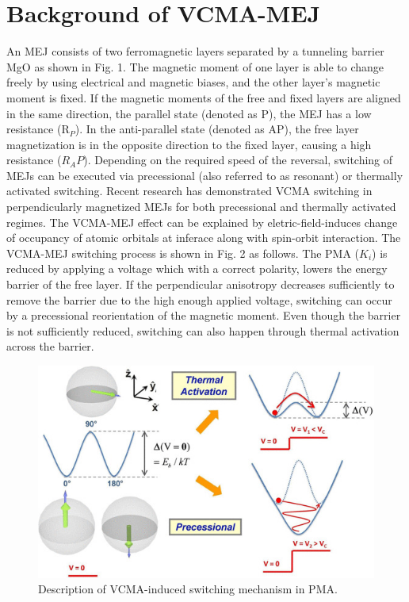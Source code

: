 \documentclass[a4paper, 12pt]{article}
\begin{document}
\section{Background of VCMA-MEJ}
An MEJ consists of two ferromagnetic layers separated by a tunneling barrier MgO as shown in Fig. 1. The magnetic moment of one layer is able to change freely by using electrical and magnetic biases, and the other layer's magnetic moment is fixed. If the magnetic moments of the free and fixed layers are aligned in the same direction, the parallel state (denoted as P), the MEJ has a low resistance (R$_P$). In the anti-parallel state (denoted as AP), the free layer magnetization is in the opposite direction to the fixed layer, causing a high resistance ($R_AP$). Depending on the required speed of the reversal, switching of MEJs can be executed via precessional (also referred to as resonant) or thermally activated switching. Recent research has demonstrated VCMA switching in perpendicularly magnetized MEJs for both precessional and thermally activated regimes. The VCMA-MEJ effect can be explained by eletric-field-induces change of occupancy of atomic orbitals at inferace along with spin-orbit interaction. The VCMA-MEJ switching process is shown in Fig. 2 as follows. The PMA ($K_i$) is reduced by applying a voltage which with a correct polarity, lowers the energy barrier of the free layer. If the perpendicular anisotropy decreases sufficiently to remove the barrier due to the high enough applied voltage, switching can occur by a precessional reorientation of the magnetic moment. Even though the barrier is not sufficiently reduced, switching can also happen through thermal activation across the barrier.

	\begin{figure}[H]
	\begin{center}
		\includegraphics[scale=0.5]{Fig2.jpg}
		\caption {Description of VCMA-induced switching mechanism in PMA.}
	\end{center}	
	\end{figure}
\end{document}
